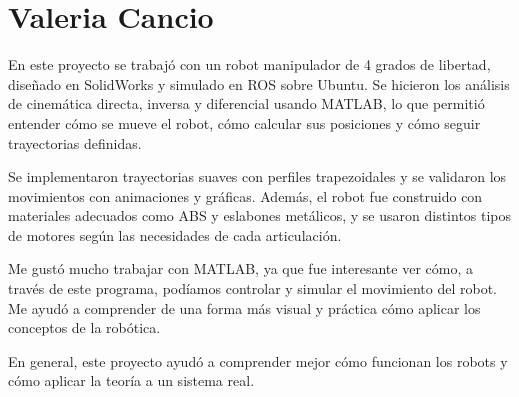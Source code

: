 \section{Valeria Cancio}
En este proyecto se trabajó con un robot manipulador de 4 grados de libertad, diseñado en SolidWorks y simulado en ROS sobre Ubuntu. Se hicieron los análisis de cinemática directa, inversa y diferencial usando MATLAB, lo que permitió entender cómo se mueve el robot, cómo calcular sus posiciones y cómo seguir trayectorias definidas.

Se implementaron trayectorias suaves con perfiles trapezoidales y se validaron los movimientos con animaciones y gráficas. Además, el robot fue construido con materiales adecuados como ABS y eslabones metálicos, y se usaron distintos tipos de motores según las necesidades de cada articulación.

Me gustó mucho trabajar con MATLAB, ya que fue interesante ver cómo, a través de este programa, podíamos controlar y simular el movimiento del robot. Me ayudó a comprender de una forma más visual y práctica cómo aplicar los conceptos de la robótica.

En general, este proyecto ayudó a comprender mejor cómo funcionan los robots y cómo aplicar la teoría a un sistema real.